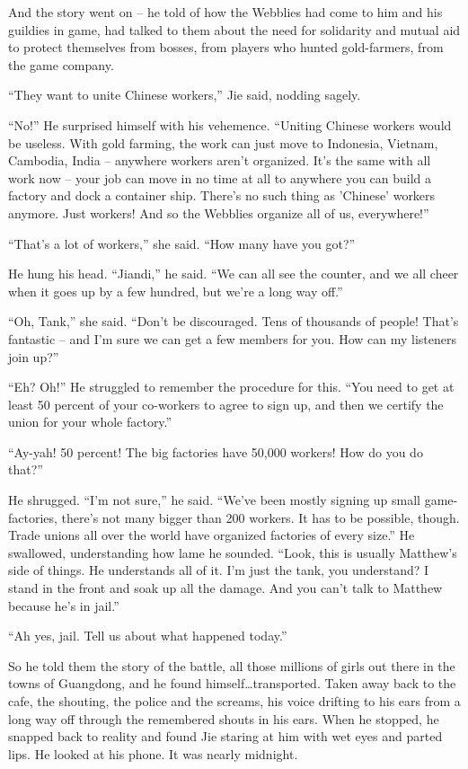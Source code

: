 And the story went on -- he told of how the Webblies had come to
him and his guildies in game, had talked to them about the need for
solidarity and mutual aid to protect themselves from bosses, from
players who hunted gold-farmers, from the game company.

``They want to unite Chinese workers,'' Jie said, nodding sagely.

``No!'' He surprised himself with his vehemence. ``Uniting Chinese
workers would be useless. With gold farming, the work can just move
to Indonesia, Vietnam, Cambodia, India -- anywhere workers aren't
organized. It's the same with all work now -- your job can move in
no time at all to anywhere you can build a factory and dock a
container ship. There's no such thing as 'Chinese' workers anymore.
Just workers! And so the Webblies organize all of us, everywhere!''

``That's a lot of workers,'' she said. ``How many have you got?''

He hung his head. ``Jiandi,'' he said. ``We can all see the counter,
and we all cheer when it goes up by a few hundred, but we're a long
way off.''

``Oh, Tank,'' she said. ``Don't be discouraged. Tens of thousands of
people! That's fantastic -- and I'm sure we can get a few members
for you. How can my listeners join up?''

``Eh? Oh!'' He struggled to remember the procedure for this. ``You
need to get at least 50 percent of your co-workers to agree to sign
up, and then we certify the union for your whole factory.''

``Ay-yah! 50 percent! The big factories have 50,000 workers! How do
you do that?''

He shrugged. ``I'm not sure,'' he said. ``We've been mostly signing up
small game-factories, there's not many bigger than 200 workers. It
has to be possible, though. Trade unions all over the world have
organized factories of every size.'' He swallowed, understanding how
lame he sounded. ``Look, this is usually Matthew's side of things.
He understands all of it. I'm just the tank, you understand? I
stand in the front and soak up all the damage. And you can't talk
to Matthew because he's in jail.''

``Ah yes, jail. Tell us about what happened today.''

So he told them the story of the battle, all those millions of
girls out there in the towns of Guangdong, and he found
himself\ldots{}transported. Taken away back to the cafe, the shouting,
the police and the screams, his voice drifting to his ears from a
long way off through the remembered shouts in his ears. When he
stopped, he snapped back to reality and found Jie staring at him
with wet eyes and parted lips. He looked at his phone. It was
nearly midnight.

